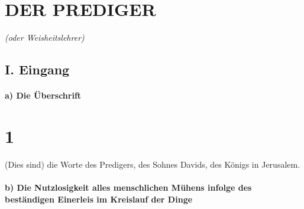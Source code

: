 \hypertarget{der-prediger}{%
\section{DER PREDIGER}\label{der-prediger}}

\emph{(oder Weisheitslehrer)}

\hypertarget{i.-eingang}{%
\subsection{I. Eingang}\label{i.-eingang}}

\hypertarget{a-die-uxfcberschrift}{%
\paragraph{a) Die Überschrift}\label{a-die-uxfcberschrift}}

\hypertarget{section}{%
\section{1}\label{section}}

(Dies sind) die Worte des Predigers, des Sohnes Davids,
des Königs in Jerusalem.

\hypertarget{b-die-nutzlosigkeit-alles-menschlichen-muxfchens-infolge-des-bestuxe4ndigen-einerleis-im-kreislauf-der-dinge}{%
\paragraph{b) Die Nutzlosigkeit alles menschlichen Mühens infolge des
beständigen Einerleis im Kreislauf der
Dinge}\label{b-die-nutzlosigkeit-alles-menschlichen-muxfchens-infolge-des-bestuxe4ndigen-einerleis-im-kreislauf-der-dinge}}

